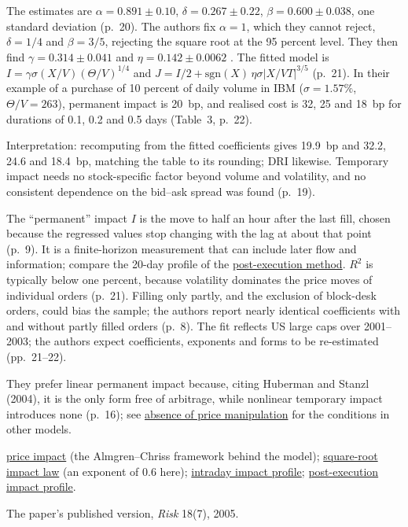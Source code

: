 \begin{qfmethod}
 The estimates are $\alpha=0.891\pm0.10$, $\delta=0.267\pm0.22$, $\beta=0.600\pm0.038$, one standard deviation (p.~20). The authors fix $\alpha=1$, which they cannot reject, $\delta=1/4$ and $\beta=3/5$, rejecting the square root at the 95 percent level. They then find $\gamma=0.314\pm0.041$ and $\eta=0.142\pm0.0062$ \citep[same preprint, secs.~4.2--4.3, pp.~20--21]{wide-almgren-direct-impact}. The fitted model is $I=\gamma\sigma(X/V)(\Theta/V)^{1/4}$ and $J=I/2+\mathrm{sgn}(X)\,\eta\sigma|X/VT|^{3/5}$ (p.~21). In their example of a purchase of 10 percent of daily volume in IBM ($\sigma=1.57\%$, $\Theta/V=263$), permanent impact is 20~bp, and realised cost is 32, 25 and 18~bp for durations of 0.1, 0.2 and 0.5 days (Table~3, p.~22).

Interpretation: recomputing from the fitted coefficients gives 19.9~bp and 32.2, 24.6 and 18.4~bp, matching the table to its rounding; DRI likewise. Temporary impact needs no stock-specific factor beyond volume and volatility, and no consistent dependence on the bid--ask spread was found (p.~19).

 The ``permanent'' impact $I$ is the move to half an hour after the last fill, chosen because the regressed values stop changing with the lag at about that point (p.~9). It is a finite-horizon measurement that can include later flow and information; compare the 20-day profile of the \hyperref[meth:post-execution-impact-profile]{post-execution method}. $R^2$ is typically below one percent, because volatility dominates the price moves of individual orders (p.~21). Filling only partly, and the exclusion of block-desk orders, could bias the sample; the authors report nearly identical coefficients with and without partly filled orders (p.~8). The fit reflects US large caps over 2001--2003; the authors expect coefficients, exponents and forms to be re-estimated (pp.~21--22).

They prefer linear permanent impact because, citing Huberman and Stanzl (2004), it is the only form free of arbitrage, while nonlinear temporary impact introduces none (p.~16); see \hyperref[res:no-price-manipulation]{absence of price manipulation} for the conditions in other models.

 \hyperref[def:price-impact]{price impact} (the Almgren--Chriss framework behind the model); \hyperref[ev:square-root-impact]{square-root impact law} (an exponent of 0.6 here); \hyperref[ev:intraday-impact-profile]{intraday impact profile}; \hyperref[meth:post-execution-impact-profile]{post-execution impact profile}.

 The paper's published version, \emph{Risk} 18(7), 2005.

\end{qfmethod}

